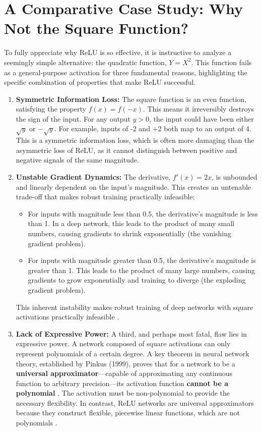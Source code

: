 \section{A Comparative Case Study: Why Not the Square Function?}
\label{sec:square_function_case_study}

To fully appreciate why ReLU is so effective, it is instructive to analyze a seemingly simple alternative: the quadratic function, $Y=X^2$. This function fails as a general-purpose activation for three fundamental reasons, highlighting the specific combination of properties that make ReLU successful.

\begin{enumerate}
    \item \textbf{Symmetric Information Loss:} The square function is an even function, satisfying the property $f(x) = f(-x)$. This means it irreversibly destroys the sign of the input. For any output $y > 0$, the input could have been either $\sqrt{y}$ or $-\sqrt{y}$. For example, inputs of -2 and +2 both map to an output of 4. This is a symmetric information loss, which is often more damaging than the asymmetric loss of ReLU, as it cannot distinguish between positive and negative signals of the same magnitude.

    \item \textbf{Unstable Gradient Dynamics:} The derivative, $f'(x) = 2x$, is unbounded and linearly dependent on the input's magnitude. This creates an untenable trade-off that makes robust training practically infeasible:
    \begin{itemize}
        \item For inputs with magnitude less than 0.5, the derivative's magnitude is less than 1. In a deep network, this leads to the product of many small numbers, causing gradients to shrink exponentially (the vanishing gradient problem).
        \item For inputs with magnitude greater than 0.5, the derivative's magnitude is greater than 1. This leads to the product of many large numbers, causing gradients to grow exponentially and training to diverge (the exploding gradient problem).
    \end{itemize}
    This inherent instability makes robust training of deep networks with square activations practically infeasible \cite{Hochreiter2001GradientFlow}.

    \item \textbf{Lack of Expressive Power:} A third, and perhaps most fatal, flaw lies in expressive power. A network composed of square activations can only represent polynomials of a certain degree. A key theorem in neural network theory, established by Pinkus (1999), proves that for a network to be a \textbf{universal approximator}—capable of approximating any continuous function to arbitrary precision—its activation function \textbf{cannot be a polynomial} \cite{Pinkus1999ApproximationTheory}. The activation must be non-polynomial to provide the necessary flexibility. In contrast, ReLU networks are universal approximators because they construct flexible, piecewise linear functions, which are not polynomials \cite{Hornik1989UniversalApprox}.
\end{enumerate}
